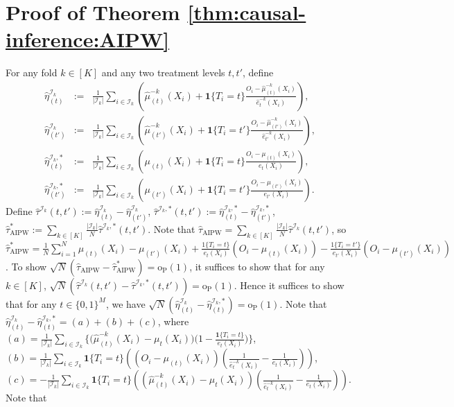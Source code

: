 \documentclass[11pt]{article}
\begin{document}
\section{Proof of Theorem \ref{thm:causal-inference:AIPW}}\label{sec:results:ATE}
For any fold $k\in[K]$ and any two treatment levels $t,t'$, define 
$$\begin{array}{rcl}
\displaystyle\hat{\eta}_{(t)}^{\mathcal{I}_k}&:=&\displaystyle\frac{1}{|\mathcal{I}_k|}\sum_{i\in\mathcal{I}_k}\left(\hat{\mu}_{(t)}^{-k}(X_i)+\mathbf{1}\{T_i=t\}\frac{O_i-\hat{\mu}_{(t)}^{-k}(X_i)}{\hat{e}_t^{-k}(X_i)}\right),\\
\displaystyle\hat{\eta}_{(t')}^{\mathcal{I}_k}&:=&\displaystyle\frac{1}{|\mathcal{I}_k|}\sum_{i\in\mathcal{I}_k}\left(\hat{\mu}_{(t')}^{-k}(X_i)+\mathbf{1}\{T_i=t'\}\frac{O_i-\hat{\mu}_{(t')}^{-k}(X_i)}{\hat{e}_{t'}^{-k}(X_i)}\right),\\
\displaystyle\hat{\eta}_{(t)}^{\mathcal{I}_k,*}&:=&\displaystyle\frac{1}{|\mathcal{I}_k|}\sum_{i\in\mathcal{I}_k}\left({\mu}_{(t)}(X_i)+\mathbf{1}\{T_i=t\}\frac{O_i-{\mu}_{(t)}(X_i)}{{e}_t(X_i)}\right),\\
\displaystyle\hat{\eta}_{(t')}^{\mathcal{I}_k,*}&:=&\displaystyle\frac{1}{|\mathcal{I}_k|}\sum_{i\in\mathcal{I}_k}\left({\mu}_{(t')}(X_i)+\mathbf{1}\{T_i=t'\}\frac{O_i-{\mu}_{(t')}(X_i)}{{e}_{t'}(X_i)}\right).
\end{array}$$
Define $\hat{\tau}^{\mathcal{I}_k}(t,t'):=\hat{\eta}_{(t)}^{\mathcal{I}_k}-\hat{\eta}_{(t')}^{\mathcal{I}_k}$, $\hat{\tau}^{\mathcal{I}_k,*}(t,t'):=\hat{\eta}_{(t)}^{\mathcal{I}_k,*}-\hat{\eta}_{(t')}^{\mathcal{I}_k,*}$, $\hat{\tau}_{\textrm{AIPW}}^*:=\sum_{k\in[K]}\frac{|\mathcal{I}_k|}{N}\hat{\tau}^{\mathcal{I}_k,*}(t,t')$. Note that $\hat{\tau}_{\textrm{AIPW}}=\sum_{k\in[K]}\frac{|\mathcal{I}_k|}{N}\hat{\tau}^{\mathcal{I}_k}(t,t')$, so $\hat{\tau}_{\textrm{AIPW}}^*=\frac{1}{N}\sum_{i=1}^N \mu_{(t)}(X_i)-\mu_{(t')}(X_i)+ \frac{1\{T_i=t\}}{e_t(X_i)}(O_i - \mu_{(t)}(X_i)) - \frac{1\{T_i=t'\}}{e_{t'}(X_i)}(O_i - \mu_{(t')}(X_i))$. To show $\sqrt{N}(\hat{\tau}_{\textrm{AIPW}}-\hat{\tau}_{\textrm{AIPW}}^*)=\mathrm{o}_{\mathrm{P}}(1)$, it suffices to show that for any $k\in[K]$, $\sqrt{N}(\hat{\tau}^{\mathcal{I}_k}(t,t')-\hat{\tau}^{\mathcal{I}_k,*}(t,t'))=\mathrm{o}_{\mathrm{P}}(1)$. Hence it suffices to show that for any $t\in\{0,1\}^M$, we have $\sqrt{N}(\hat{\eta}_{(t)}^{\mathcal{I}_k}-\hat{\eta}_{(t)}^{\mathcal{I}_k,*})=\mathrm{o}_{\mathrm{P}}(1)$. Note that  $\hat{\eta}_{(t)}^{\mathcal{I}_k}-\hat{\eta}_{(t)}^{\mathcal{I}_k,*}=(a)+(b)+(c)$, where $(a)=\frac{1}{|\mathcal{I}_k|}\sum_{i\in\mathcal{I}_k}\big\{\big(\hat{\mu}_{(t)}^{-k}(X_i)-\mu_t(X_i)\big)\big(1-\frac{\mathbf{1}\{T_i=t\}}{e_t(X_i)}\big)\big\}$, $(b)=\frac{1}{|\mathcal{I}_k|}\sum_{i\in\mathcal{I}_k}\mathbf{1}\{T_i=t\}\left((O_i-\mu_{(t)}(X_i))\left(\frac{1}{\hat{e}_t^{-k}(X_i)}-\frac{1}{e_t(X_i)}\right)\right)$, $(c)=-\frac{1}{|\mathcal{I}_k|}\sum_{i\in\mathcal{I}_k}\mathbf{1}\{T_i=t\}\left(\left(\hat{\mu}_{(t)}^{-k}(X_i)-\mu_t(X_i)\right)\left(\frac{1}{\hat{e}_t^{-k}(X_i)}-\frac{1}{e_t(X_i)}\right)\right)$. Note that 
\end{document}
